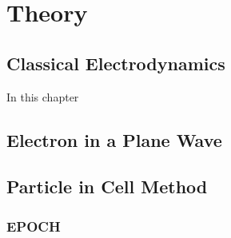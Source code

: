 \documentclass[../thesis.tex]{subfiles}
\begin{document}
\chapter{Theory}
\label{chap:Theory}

\section{Classical Electrodynamics}

In this chapter

\clearpage

\section{Electron in a Plane Wave}


\section{Particle in Cell Method}

\subsection{EPOCH}
\end{document}
